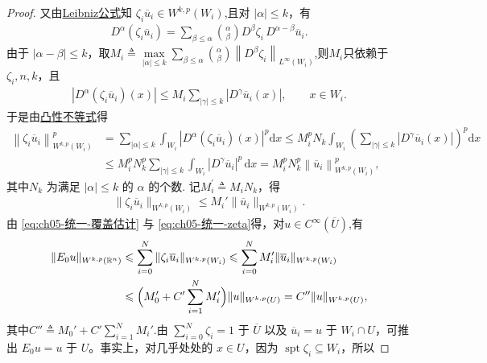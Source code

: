 \documentclass[../../main.tex]{subfiles}
\begin{document}
\begin{proof}
又由\hyperref[theorem:ch05-弱导数性质]{Leibniz公式}知 $\zeta_i\overline{u}_i\in W^{k,p}(W_i)$,且对 $|\alpha|\leqslant k$，有
\begin{align*}
D^{\alpha}(\zeta_i\overline{u}_i)=\sum_{\beta\leqslant\alpha}\binom{\alpha}{\beta}D^{\beta}\zeta_i\,D^{\alpha-\beta}\overline{u}_i.
\end{align*}
由于 $|\alpha-\beta|\leqslant k$，取$M_i\triangleq \underset{\left| \alpha \right|\leqslant k}{\max}\sum_{\beta \leqslant \alpha}{\binom{\alpha}{\beta}}\left\| D^{\beta}\zeta _i \right\| _{L^{\infty}\left( W_i \right)}$,则$M_i$只依赖于 $\zeta_i,n,k$，且
\begin{align*}
|D^{\alpha}(\zeta_i\overline{u}_i)(x)|\leqslant M_i\sum_{|\gamma|\leqslant k}|D^{\gamma}\overline{u}_i(x)|,\qquad x\in W_i.
\end{align*}
于是由\hyperref[Basis of Analytics-proposition:凸性不等式]{凸性不等式}得
\begin{align*}
\left\| \zeta _i\overline{u}_i \right\| _{W^{k,p}\left( W_i \right)}^{p}&=\sum_{|\alpha |\leqslant k}{\int_{W_i}{\left| D^{\alpha}\left( \zeta _i\overline{u}_i \right) \left( x \right) \right|^p\mathrm{d}x}}\leqslant M_{i}^{p}N_k\int_{W_i}{\left( \sum_{\left| \gamma \right|\leqslant k}{\left| D^{\gamma}\overline{u}_i\left( x \right) \right|} \right) ^p\mathrm{d}x}
\\
&\leqslant M_{i}^{p}N_{k}^{p}\sum_{|\gamma |\leqslant k}{\int_{W_i}{|D^{\gamma}\overline{u}_i|^p\,\mathrm{d}x}}=M_{i}^{p}N_{k}^{p}\left\| \overline{u}_i \right\|_{W^{k,p}(W_i)}^{p},
\end{align*}
其中$N_k$ 为满足 $|\alpha|\leqslant k$ 的 $\alpha$ 的个数.
记$M_{i}^{\prime}\triangleq M_iN_k$，得
\begin{align}
\|\zeta_i\overline{u}_i\|_{W^{k,p}(W_i)}\leqslant M_i'\|\overline{u}_i\|_{W^{k,p}(W_i)}.
\label{eq:ch05-统一-zeta}
\end{align}
由 \eqref{eq:ch05-统一-覆盖估计} 与 \eqref{eq:ch05-统一-zeta}得，对$u\in C^{\infty}(\overline{U})$,有
\begin{align}
\|E_0u\|_{W^{k,p}(\mathbb{R}^{n})}
&\leqslant\sum_{i=0}^{N}\|\zeta_i\overline{u}_i\|_{W^{k,p}(W_i)}
\leqslant\sum_{i=0}^{N}M_i'\|\overline{u}_i\|_{W^{k,p}(W_i)}
\notag\\
&\leqslant\Big(M_0'+C'\sum_{i=1}^{N}M_i'\Big)\|u\|_{W^{k,p}(U)}
= C''\|u\|_{W^{k,p}(U)},
\label{eq:ch05-统一-smooth估计}
\end{align}
其中$C''\triangleq M_0'+C'\sum_{i=1}^{N}M_i'$.由 $\sum\limits_{i=0}^{N}\zeta_i=1$ 于 $\overline{U}$ 以及 $\overline{u}_i=u$ 于 $W_i\cap U$，可推出 $E_0u=u$ 于 $U$。事实上，对几乎处处的 $x\in U$，因为 $\operatorname{spt}\zeta_i\subseteq W_i$，所以

\end{proof}
\end{document}
